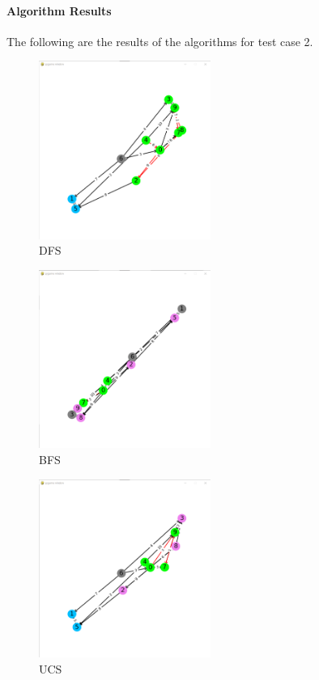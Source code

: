 \paragraph*{Algorithm Results}
\quad The following are the results of the algorithms for test case 2.

\begin{figure}[h!]
    \centering
    \includegraphics[width=0.5\textwidth]{result/testcase2/dfs.png}
    \caption{DFS}
\end{figure}
\begin{figure}[h!]
    \centering
    \includegraphics[width=0.5\textwidth]{result/testcase2/bfs.png}
    \caption{BFS}
\end{figure}
\begin{figure}[h!]
    \centering
    \includegraphics[width=0.5\textwidth]{result/testcase2/ucs.png}
    \caption{UCS}  
\end{figure}
